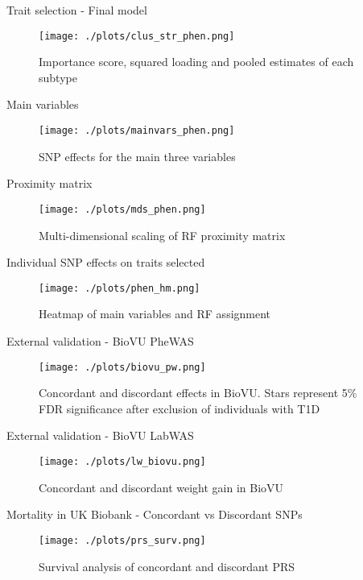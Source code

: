 \documentclass[presentation]{beamer}
\begin{document}
\begin{frame}[label={sec:org7281a03}]{Trait selection - Final model}
\begin{figure}[htbp]
\centering
\texttt{[image: ./plots/clus\_str\_phen.png]}
\caption{Importance score, squared loading and pooled estimates of each subtype}
\end{figure}
\end{frame}
\begin{frame}[label={sec:org7ccbeec}]{Main variables}
\begin{figure}[htbp]
\centering
\texttt{[image: ./plots/mainvars\_phen.png]}
\caption{SNP effects for the main three variables}
\end{figure}
\end{frame}
\begin{frame}[label={sec:orga95c470}]{Proximity matrix}
\begin{figure}[htbp]
\centering
\texttt{[image: ./plots/mds\_phen.png]}
\caption{Multi-dimensional scaling of RF proximity matrix}
\end{figure}
\end{frame}
\begin{frame}[label={sec:org55828af}]{Individual SNP effects on traits selected}
\begin{figure}[htbp]
\centering
\texttt{[image: ./plots/phen\_hm.png]}
\caption{Heatmap of main variables and RF assignment}
\end{figure}
\end{frame}
\begin{frame}[label={sec:org3c67eb1}]{External validation - BioVU PheWAS}
\begin{figure}[htbp]
\centering
\texttt{[image: ./plots/biovu\_pw.png]}
\caption{Concordant and discordant effects in BioVU. Stars represent 5\% FDR significance after exclusion of individuals with T1D}
\end{figure}
\end{frame}
\begin{frame}[label={sec:orgf9915d8}]{External validation - BioVU LabWAS}
\begin{figure}[htbp]
\centering
\texttt{[image: ./plots/lw\_biovu.png]}
\caption{Concordant and discordant weight gain in BioVU}
\end{figure}
\end{frame}
\begin{frame}[label={sec:orgc4316e7}]{Mortality in UK Biobank - Concordant vs Discordant SNPs}
\begin{figure}[htbp]
\centering
\texttt{[image: ./plots/prs\_surv.png]}
\caption{Survival analysis of concordant and discordant PRS}
\end{figure}
\end{frame}
\end{document}
